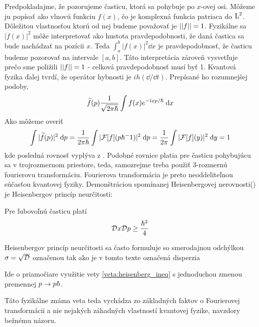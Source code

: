 Predpokladajme, že pozorujeme časticu, ktorá sa pohybuje po $x$-ovej
osi. Môžeme ju popísať ako vlnovú funkciu $f(x)$, čo je komplexná
funkcia patriaca do $\mbox{L}^2$. Dôležitou vlastnosťou ktorú od nej budeme
považovať je $||f||=1$. Fyzikálne sa $|f(x)|^2$ môže interpretovať
ako hustota pravdepodobnosti, že daná častica sa bude nachádzať na
pozícii $x$. Teda 
$\int_a^b |f(x)|^2 \dd x$ je pravdepodobnosť, že časticu budeme
pozorovať na intervale $[a,b]$. Táto interpretácia zároveň vysvetľuje
prečo sme poližili $||f||=1$ - celková pravdepodobnosť musí byť 1.
Kvantová fyzika ďalej tvrdí, že operátor hybnosti je 
$i h (\dd / \dd t)$. Prepísané ho rozumnejšej podoby,
\begin{equation}
  \widetilde{f}(p) \frac{1}{\sqrt{2 \pi \hbar}} \int f(x) e^{- \hat{\imath} x p / \hbar} \; \mathrm{d} x
\end{equation}
Ako môžeme overiť
\begin{equation}
    \int |\widetilde{f}(p)|^2 \; \mathrm{d} p = \frac{1}{2 \pi \hbar} \int
    |\mathcal{F}[f](p \hbar^-1)|^2 \; \mathrm{d} p = \frac{1}{2\pi}
     \int |\mathcal{F}[f](y)|^2 \; \mathrm{d} y = 1
\end{equation}
kde posledná rovnosť vyplýva z \todo{}.
Podobné rovnice platia pre časticu pohybujúcu sa v trojrozmernom
priestore, teda, samozrejme treba použiť 3-rozmernú fourierovu
transformáciu. Fourierova transformácia je preto neoddeliteľnou
súčasťou kvantovej fyziky.
Demonštráciou spomínanej Heisenbergovej nerovnosti() je
Heisenbergov princíp neurčitosti:
\begin{veta}
    Pre ľubovoľnú časticu platí
    \begin{equation}
        \mathcal{D}_{} x \mathcal{D}_{} p \ge \frac{\hbar^2}{4}
    \end{equation}
\end{veta}
\begin{poznamka}
    Heisenbergov princíp neurčitosti sa často formuluje so smerodajnou
    odchýlkou $\sigma = \sqrt{\mathcal{D}_{}}$ označenou tak ako je v
    tomto texte označená disperzia
\end{poznamka}
\begin{dokaz}
    Ide o priamočiare využitie vety \ref{veta:heisenberg_ineq} s
    jednoduchou zmenou premennej $ p \rightarrow p \hbar$.
\end{dokaz}
Táto fyzikálne známa veta teda vychádza zo základných faktov o
Fourierovej transformácii a nie nejakých záhadných vlastností
kvantovej fyzike, navzdory bežnému názoru.

